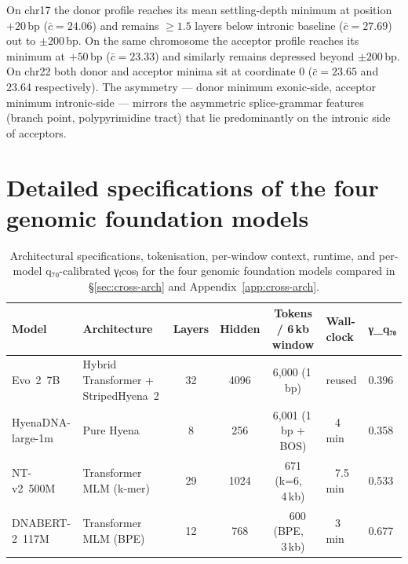 \documentclass[12pt]{article}
\theoremstyle{plain}
\theoremstyle{definition}
\theoremstyle{remark}
\begin{document}
On chr17 the donor profile reaches its mean settling-depth minimum at
position $+20$\,bp ($\bar c = 24.06$) and remains $\ge 1.5$ layers
below intronic baseline ($\bar c = 27.69$) out to $\pm 200$\,bp. On
the same chromosome the acceptor profile reaches its minimum at
$+50$\,bp ($\bar c = 23.33$) and similarly remains depressed beyond
$\pm 200$\,bp. On chr22 both donor and acceptor minima sit at coordinate
$0$ ($\bar c = 23.65$ and $23.64$ respectively). The asymmetry --- donor
minimum exonic-side, acceptor minimum intronic-side --- mirrors the
asymmetric splice-grammar features (branch point, polypyrimidine tract)
that lie predominantly on the intronic side of acceptors.

\section{Detailed specifications of the four genomic foundation models}
\label{app:fm-specs}

\begin{table}[h]
\caption{Architectural specifications, tokenisation, per-window context,
runtime, and per-model q₇₀-calibrated γ₍cos₎ for the four
genomic foundation models compared in \S\ref{sec:cross-arch} and
Appendix~\ref{app:cross-arch}.}
\label{tab:fm-specs}
\centering
\footnotesize
\setlength{\tabcolsep}{4pt}
\begin{tabular}{@{}llcccll@{}}
\toprule
Model & Architecture & Layers & Hidden & Tokens / 6\,kb window
   & Wall-clock & γ\_q₇₀ \\
\midrule
Evo~2~7B          & Hybrid Transformer + StripedHyena~2 & 32 & 4096
   & 6,000 (1\,bp)         & reused      & 0.396 \\
HyenaDNA-large-1m & Pure Hyena                          & 8 & 256
   & 6,001 (1\,bp + BOS)   & ~ 4\,min    & 0.358 \\
NT-v2~500M        & Transformer MLM (k-mer)           & 29 & 1024
   & 671 (k=6, ~ 4\,kb) & ~ 7.5\,min  & 0.533 \\
DNABERT-2~117M    & Transformer MLM (BPE)               & 12 & 768
   & ~ 600 (BPE, ~ 3\,kb)        & ~ 3\,min    & 0.677 \\
\bottomrule
\end{tabular}
\end{table}
\end{document}
